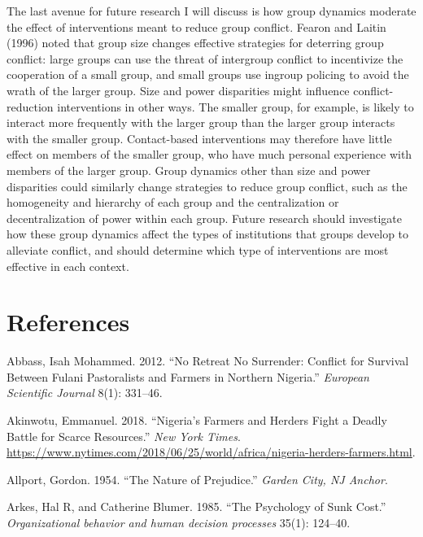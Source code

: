 \documentclass[11pt]{article}
\begin{document}
The last avenue for future research I will discuss is how group dynamics
moderate the effect of interventions meant to reduce group conflict.
Fearon and Laitin (1996) noted that group size changes effective
strategies for deterring group conflict: large groups can use the threat
of intergroup conflict to incentivize the cooperation of a small group,
and small groups use ingroup policing to avoid the wrath of the larger
group. Size and power disparities might influence conflict-reduction
interventions in other ways. The smaller group, for example, is likely
to interact more frequently with the larger group than the larger group
interacts with the smaller group. Contact-based interventions may
therefore have little effect on members of the smaller group, who have
much personal experience with members of the larger group. Group
dynamics other than size and power disparities could similarly change
strategies to reduce group conflict, such as the homogeneity and
hierarchy of each group and the centralization or decentralization of
power within each group. Future research should investigate how these
group dynamics affect the types of institutions that groups develop to
alleviate conflict, and should determine which type of interventions are
most effective in each context.

\hypertarget{references}{%
\section*{References}\label{references}}

\hypertarget{refs}{}
\leavevmode\hypertarget{ref-abbass2012no}{}%
Abbass, Isah Mohammed. 2012. ``No Retreat No Surrender: Conflict for
Survival Between Fulani Pastoralists and Farmers in Northern Nigeria.''
\emph{European Scientific Journal} 8(1): 331--46.

\leavevmode\hypertarget{ref-nyt2018nigeria}{}%
Akinwotu, Emmanuel. 2018. ``Nigeria's Farmers and Herders Fight a Deadly
Battle for Scarce Resources.'' \emph{New York Times}.
\url{https://www.nytimes.com/2018/06/25/world/africa/nigeria-herders-farmers.html}.

\leavevmode\hypertarget{ref-allport1954prejudice}{}%
Allport, Gordon. 1954. ``The Nature of Prejudice.'' \emph{Garden City,
NJ Anchor}.

\leavevmode\hypertarget{ref-arkes1985psychology}{}%
Arkes, Hal R, and Catherine Blumer. 1985. ``The Psychology of Sunk
Cost.'' \emph{Organizational behavior and human decision processes}
35(1): 124--40.
\end{document}
